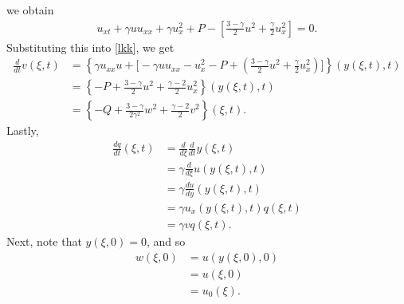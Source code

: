 \documentclass[12pt,reqno]{amsart}
\numberwithin{equation}{section}  %
\numberwithin{figure}{section}
\begin{document}
%
%
we obtain
%
%
\begin{equation*}
\begin{split}
u_{xt} + \gamma u u_{xx} + \gamma u_{x}^{2} + P - \left [ \frac{3 -
\gamma}{2}u^{2} + \frac{\gamma}{2} u_{x}^{2} \right ]  = 0.
\end{split}
\end{equation*}
%
%
Substituting this into \eqref{lkk}, we get
%
%
\begin{equation*}
\begin{split}
\frac{d}{dt}v(\xi, t)
& = \left \{ \gamma u_{xx} u + \big[- \gamma uu_{xx} - u_{x}^{2} - P + \left ( \frac{3 - \gamma}{2} u^{2} + \frac{\gamma}{2}u_{x}^{2} \right ) ] \right \}(y(\xi, t), t)
\\
& = \left \{- P  + \frac{3 - \gamma}{2} u^{2} + \frac{\gamma-2}{2} u_{x}^{2} \right \}(y(\xi, t), t)
\\
& = \left \{-Q + \frac{3- \gamma}{2 \gamma^{2}}w^{2} + \frac{\gamma-2}{2}
v^{2} \right \}(\xi, t).
\end{split}
\end{equation*}
%
Lastly,
%
%
%
%
\begin{equation*}
\begin{split}
\frac{dq}{dt}(\xi, t)
& = \frac{d}{d\xi}\frac{d}{dt}y(\xi, t)
\\
& = \gamma \frac{d}{d \xi}u(y(\xi, t), t)
\\
& = \gamma \frac{du}{dy}(y(\xi,t),t)
\\
& = \gamma u_{x}(y(\xi, t), t)q(\xi, t)
\\
& = \gamma vq(\xi, t).
\end{split}
\end{equation*}
%
%
Next, note that $y(\xi, 0) = 0$, and so
%
%
\begin{equation*}
\begin{split}
w(\xi, 0)
& =  u(y(\xi, 0), 0)
\\
& =  u(\xi, 0)
\\
& =  u_{0}(\xi).
\end{split}
\end{equation*}
%
%
\end{document}
